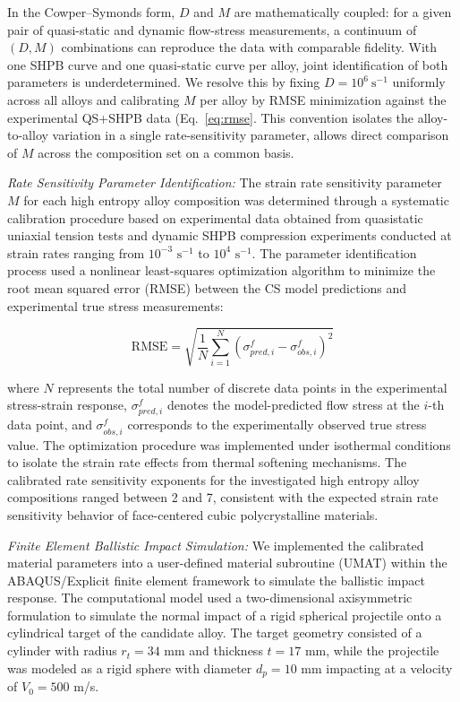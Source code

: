 In the Cowper--Symonds form, $D$ and $M$ are mathematically coupled: for a given pair of quasi-static and dynamic flow-stress measurements, a continuum of $(D, M)$ combinations can reproduce the data with comparable fidelity. With one SHPB curve and one quasi-static curve per alloy, joint identification of both parameters is underdetermined. We resolve this by fixing $D = 10^{6}\ \text{s}^{-1}$ uniformly across all alloys and calibrating $M$ per alloy by RMSE minimization against the experimental QS+SHPB data (Eq.~\ref{eq:rmse}. This convention isolates the alloy-to-alloy variation in a single rate-sensitivity parameter, allows direct comparison of $M$ across the composition set on a common basis.

\emph{Rate Sensitivity Parameter Identification:} The strain rate sensitivity parameter $M$ for each high entropy alloy composition was determined through a systematic calibration procedure based on experimental data obtained from quasistatic uniaxial tension tests and dynamic SHPB compression experiments conducted at strain rates ranging from $10^{-3} \text{ s}^{-1}$ to $10^4 \text{ s}^{-1}$. The parameter identification process used a nonlinear least-squares optimization algorithm to minimize the root mean squared error (RMSE) between the CS model predictions and experimental true stress measurements:

\begin{equation}
\text{RMSE} = \sqrt{\frac{1}{N}\sum_{i=1}^{N}\left(\sigma_{pred,i}^f - \sigma_{obs,i}^f\right)^2}
\label{eq:rmse}
\end{equation}

where $N$ represents the total number of discrete data points in the experimental stress-strain response, $\sigma_{pred,i}^f$ denotes the model-predicted flow stress at the $i$-th data point, and $\sigma_{obs,i}^f$ corresponds to the experimentally observed true stress value. The optimization procedure was implemented under isothermal conditions to isolate the strain rate effects from thermal softening mechanisms. The calibrated rate sensitivity exponents for the investigated high entropy alloy compositions ranged between 2 and 7, consistent with the expected strain rate sensitivity behavior of face-centered cubic polycrystalline materials.

\emph{Finite Element Ballistic Impact Simulation:} We implemented the calibrated material parameters into a user-defined material subroutine (UMAT) within the ABAQUS/Explicit finite element framework to simulate the ballistic impact response. The computational model used a two-dimensional axisymmetric formulation to simulate the normal impact of a rigid spherical projectile onto a cylindrical target of the candidate alloy. The target geometry consisted of a cylinder with radius $r_t = 34$ mm and thickness $t = 17$ mm, while the projectile was modeled as a rigid sphere with diameter $d_p = 10$ mm impacting at a velocity of $V_0 = 500$ m/s.

